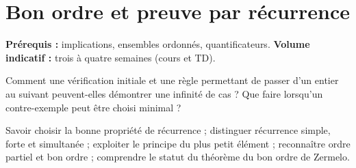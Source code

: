 \chapter{Bon ordre et preuve par récurrence}
\label{chap:recurrence}
\begin{flushleft}\small\sffamily
\textbf{Prérequis :} implications, ensembles ordonnés, quantificateurs.\qquad
\textbf{Volume indicatif :} trois à quatre semaines (cours et TD).
\end{flushleft}
\begin{questionfondatrice}
Comment une vérification initiale et une règle permettant de passer d'un entier au suivant peuvent-elles démontrer une infinité de cas ? Que faire lorsqu'un contre-exemple peut être choisi minimal ?
\end{questionfondatrice}
\begin{objectifs}
Savoir choisir la bonne propriété de récurrence ; distinguer récurrence simple, forte et simultanée ; exploiter le principe du plus petit élément ; reconnaître ordre partiel et bon ordre ; comprendre le statut du théorème du bon ordre de Zermelo.
\end{objectifs}

